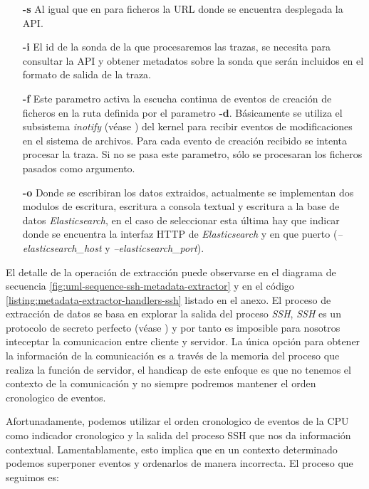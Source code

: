 \begin{itemize}
    \item[\textbf{-s}] Al igual que en para ficheros la URL donde se encuentra desplegada la API.
    \item[\textbf{-i}] El id de la sonda de la que procesaremos las trazas, se necesita para consultar la API y obtener metadatos
    sobre la sonda que serán incluidos en el formato de salida de la traza. 
    \item[\textbf{-f}] Este parametro activa la escucha continua de eventos de creación de ficheros en la ruta definida por el parametro \textbf{-d}. Básicamente 
    se utiliza el subsistema \emph{inotify} (véase \cite{wiki-inotify}) del kernel para recibir eventos de modificaciones en el sistema de archivos. Para cada
    evento de creación recibido se intenta procesar la traza. Si no se pasa este parametro, sólo se procesaran los ficheros pasados como argumento.
    \item[\textbf{-o}] Donde se escribiran los datos extraidos, actualmente se implementan dos modulos de escritura, escritura a consola textual
    y escritura a la base de datos \emph{Elasticsearch}, en el caso de seleccionar esta última hay que indicar donde se encuentra la interfaz HTTP de \emph{Elasticsearch} y
    en que puerto (\emph{--elasticsearch\_host} y  \emph{--elasticsearch\_port}). 
\end{itemize}

El detalle de la operación de extracción puede observarse en el diagrama de secuencia \ref{fig:uml-sequence-ssh-metadata-extractor} y en el código \ref{listing:metadata-extractor-handlers-ssh} listado en el anexo. 
El proceso de extracción de datos se basa en explorar la salida del proceso \emph{SSH}, \emph{SSH} es un protocolo de secreto perfecto (véase \cite{wiki-fsecrecy}) y
por tanto es imposible para nosotros inteceptar la comunicacion entre cliente y servidor. La única opción para obtener la información de la comunicación es a través
de la memoria del proceso que realiza la función de servidor, el handicap de este enfoque es que no tenemos el contexto de la comunicación y no siempre podremos
mantener el orden cronologico de eventos.

Afortunadamente, podemos utilizar el orden cronologico de eventos de la CPU como indicador cronologico y la salida del proceso SSH que nos da información contextual. Lamentablamente,
esto implica que en un contexto determinado podemos superponer eventos y ordenarlos de manera incorrecta. El proceso que seguimos es:


